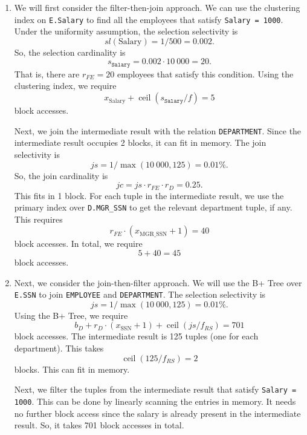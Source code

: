\documentclass[a4paper, openany]{memoir}
\theoremstyle{definition}
\begin{document}
\begin{answer}
    \begin{enumerate}
        \item We will first consider the filter-then-join approach. We can use the clustering index on \texttt{E.Salary} to find all the employees that satisfy \texttt{Salary = 1000}. Under the uniformity assumption, the selection selectivity is
        \[\textit{sl}(\text{Salary}) = 1/500 = 0.002.\]
        So, the selection cardinality is
        \[s_{\texttt{Salary}} = 0.002 \cdot 10 \ 000 = 20.\]
        That is, there are $r_{FE} = 20$ employees that satisfy this condition. Using the clustering index, we require
        \[x_{\text{Salary}} + \operatorname{ceil}(s_{\texttt{Salary}}/f) = 5\]
        block accesses.
    
        Next, we join the intermediate result with the relation \texttt{DEPARTMENT}. Since the intermediate result occupies 2 blocks, it can fit in memory. The join selectivity is
        \[\textit{js} = 1/\max(10 \ 000, 125) = 0.01\%.\]
        So, the join cardinality is
        \[\textit{jc} = \textit{js} \cdot r_{FE} \cdot r_D = 0.25.\]
        This fits in 1 block. For each tuple in the intermediate result, we use the primary index over \texttt{D.MGR\_SSN} to get the relevant department tuple, if any. This requires
        \[r_{FE} \cdot (x_{\text{MGR\_SSN}} + 1) = 40\]
        block accesses. In total, we require
        \[5 + 40 = 45\]
        block accesses.

        \item Next, we consider the join-then-filter approach. We will use the B+ Tree over \texttt{E.SSN} to join \texttt{EMPLOYEE} and \texttt{DEPARTMENT}. The selection selectivity is
        \[\textit{js} = 1/\max(10 \ 000, 125) = 0.01\%.\]
        Using the B+ Tree, we require
        \[b_D + r_D \cdot (x_{\text{SSN}} + 1) + \operatorname{ceil}(\textit{js}/f_{RS}) = 701\]
        block accesses. The intermediate result is 125 tuples (one for each department). This takes
        \[\operatorname{ceil}(125/f_{RS}) = 2\]
        blocks. This can fit in memory.
    
        Next, we filter the tuples from the intermediate result that satisfy \texttt{Salary = 1000}. This can be done by linearly scanning the entries in memory. It needs no further block access since the salary is already present in the intermediate result. So, it takes 701 block accesses in total.
    \end{enumerate}
\end{answer}
\end{document}
